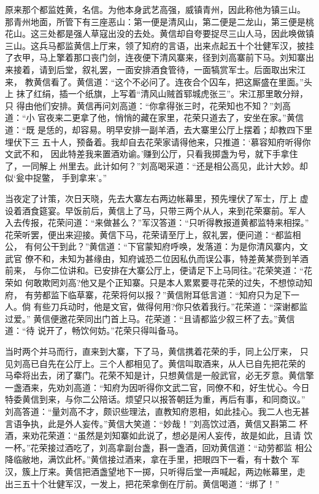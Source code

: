 原来那个都监姓黄，名信。为他本身武艺高强，威镇青州，因此称他为镇三山。
那青州地面，所管下有三座恶山：第一便是清风山，第二便是二龙山，第三便是桃
花山。这三处都是强人草寇出没的去处。黄信却自夸要捉尽三山人马，因此唤做镇
三山。这兵马都监黄信上厅来，领了知府的言语，出来点起五十个壮健军汉，披挂
了衣甲，马上擎着那口丧门剑，连夜便下清风寨来，径到刘高寨前下马。刘知寨出
来接着，请到后堂，叙礼罢，一面安排酒食管待，一面犒赏军士。后面取出宋江来，
教黄信看了。黄信道：“这个不必问了。连夜合个囚车，把这厮盛在里面。”头上
抹了红绢，插一个纸旗，上写着“清风山贼首郓城虎张三”。宋江那里敢分辩，只
得由他们安排。黄信再问刘高道：“你拿得张三时，花荣知也不知？”刘高道：“小
官夜来二更拿了他，悄悄的藏在家里，花荣只道去了，安坐在家。”黄信道：“既
是恁的，却容易。明早安排一副羊酒，去大寨里公厅上摆着；却教四下里埋伏下三
五十人，预备着。我却自去花荣家请得他来，只推道：‘慕容知府听得你文武不和，
因此特差我来置酒劝谕。’赚到公厅，只看我掷盏为号，就下手拿住了，一同解上
州里去。此计如何？”刘高喝采道：“还是相公高见，此计大妙。却似‘瓮中捉鳖，
手到拿来’。”

当夜定了计策，次日天晓，先去大寨左右两边帐幕里，预先埋伏了军士，厅上
虚设着酒食筵宴。早饭前后，黄信上了马，只带三两个从人，来到花荣寨前。军人
入去传报，花荣问道：“来做甚么？”军汉答道：“只听得教报道黄都监特来相探。”
花荣听罢，便出来迎接。黄信下马，花荣请至厅上，叙礼罢，便问道：“都监相公，
有何公干到此？”黄信道：“下官蒙知府呼唤，发落道：为是你清风寨内，文武官
僚不和，未知为甚缘由，知府诚恐二位因私仇而误公事，特差黄某赍到羊酒前来，
与你二位讲和。已安排在大寨公厅上，便请足下上马同往。”花荣笑道：“花荣如
何敢欺罔刘高?他又是个正知寨。只是本人累累要寻花荣的过失，不想惊动知府，
有劳都监下临草寨，花荣将何以报？”黄信附耳低言道：“知府只为足下一人。倘
有些刀兵动时，他是文官，做得何用?你只依着我行。”花荣道：“深谢都监过爱。”
黄信便邀花荣同出门首上马。花荣道：“且请都监少叙三杯了去。”黄信道：“待
说开了，畅饮何妨。”花荣只得叫备马。

当时两个并马而行，直来到大寨，下了马，黄信携着花荣的手，同上公厅来，
只见刘高已自先在公厅上。三个人都相见了。黄信叫取酒来，从人已自先把花荣的
马牵将出去，闭了寨门。花荣不知是计，只想黄信是一般武官，必无歹意。黄信擎
一盏酒来，先劝刘高道：“知府为因听得你文武二官，同僚不和，好生忧心。今日
特委黄信到来，与你二公陪话。烦望只以报答朝廷为重，再后有事，和同商议。”
刘高答道：“量刘高不才，颇识些理法，直教知府恩相，如此挂心。我二人也无甚
言语争执，此是外人妄传。”黄信大笑道：“妙哉！”刘高饮过酒，黄信又斟第二
杯酒，来劝花荣道：“虽然是刘知寨如此说了，想必是闲人妄传，故是如此，且请
饮一杯。”花荣接过酒吃了，刘高拿副台盏，斟一盏酒，回劝黄信道：“动劳都监
相公降临敝地，满饮此杯。”黄信接过酒来，拿在手里，把眼四下一看，有十数个
军汉，簇上厅来。黄信把酒盏望地下一掷，只听得后堂一声喊起，两边帐幕里，走
出三五十个壮健军汉，一发上，把花荣拿倒在厅前。黄信喝道：“绑了！”

